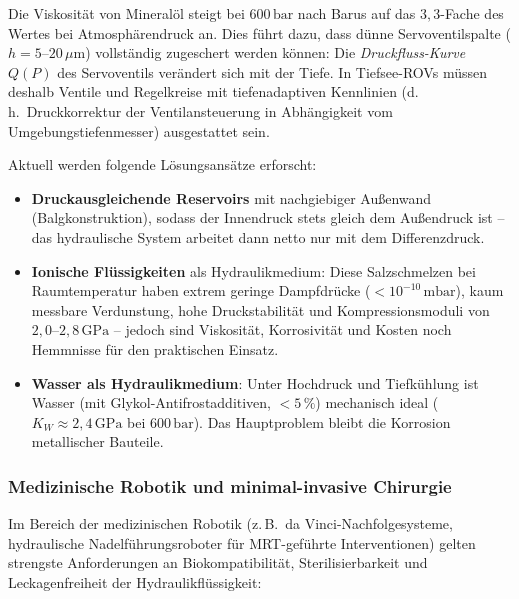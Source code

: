 ﻿\documentclass[a4paper,12pt]{scrreprt}
\theoremstyle{definition}
\begin{document}
Die Viskosität von Mineralöl steigt bei $600\,\mathrm{bar}$ nach
Barus auf das $3{,}3$-Fache des Wertes bei Atmosphärendruck an. Dies
führt dazu, dass dünne Servoventilspalte ($h = 5$--$20\,\mu\mathrm{m}$)
vollständig zugeschert werden können: Die \emph{Druckfluss-Kurve}
$Q(P)$ des Servoventils verändert sich mit der Tiefe. In Tiefsee-ROVs
müssen deshalb Ventile und Regelkreise mit tiefenadaptiven Kennlinien
(d.\,h.\ Druckkorrektur der Ventilansteuerung in Abhängigkeit vom
Umgebungstiefenmesser) ausgestattet sein.

Aktuell werden folgende Lösungsansätze erforscht:
\begin{itemize}
  \item \textbf{Druckausgleichende Reservoirs} mit nachgiebiger
    Außenwand (Balgkonstruktion), sodass der Innendruck stets gleich
    dem Außendruck ist -- das hydraulische System arbeitet dann
    netto nur mit dem Differenzdruck.
  \item \textbf{Ionische Flüssigkeiten} als Hydraulikmedium:
    Diese Salzschmelzen bei Raumtemperatur haben extrem geringe
    Dampfdrücke ($< 10^{-10}\,\mathrm{mbar}$), kaum messbare
    Verdunstung, hohe Druckstabilität und Kompressionsmoduli
    von $2{,}0$--$2{,}8\,\mathrm{GPa}$ -- jedoch sind Viskosität,
    Korrosivität und Kosten noch Hemmnisse für den praktischen Einsatz.
  \item \textbf{Wasser als Hydraulikmedium}: Unter Hochdruck und
    Tiefkühlung ist Wasser (mit Glykol-Antifrostadditiven, $< 5\,\%$)
    mechanisch ideal ($K_W \approx 2{,}4\,\mathrm{GPa}$ bei
    $600\,\mathrm{bar}$). Das Hauptproblem bleibt die Korrosion
    metallischer Bauteile.
\end{itemize}

\subsubsection{Medizinische Robotik und minimal-invasive Chirurgie}

Im Bereich der medizinischen Robotik (z.\,B.\ da Vinci-Nachfolge\-systeme,
hydraulische Nadelführungsroboter für MRT-geführte Interventionen)
gelten strengste Anforderungen an Biokompatibilität, Sterilisierbarkeit
und Leckagenfreiheit der Hydraulikflüssigkeit:
\end{document}
